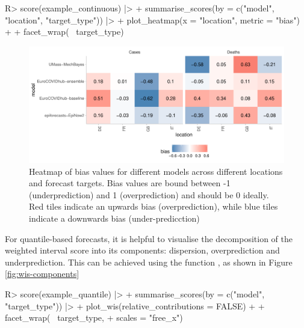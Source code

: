 \documentclass[
]{jss}
\begin{document}
\begin{CodeChunk}
\begin{CodeInput}
R> score(example_continuous) |>
+   summarise_scores(by = c("model", "location", "target_type")) |>
+   plot_heatmap(x = "location", metric = "bias") + 
+     facet_wrap(~ target_type) 
\end{CodeInput}
\begin{figure}[!h]

{\centering \includegraphics[width=1\linewidth]{manuscript_files/figure-latex/score-heatmap-1} 

}

\caption[Heatmap of bias values for different models across different locations and forecast targets]{Heatmap of bias values for different models across different locations and forecast targets. Bias values are bound between -1 (underprediction) and 1 (overprediction) and should be 0 ideally. Red tiles indicate an upwards bias (overprediction), while blue tiles indicate a downwards bias (under-predicction)}\label{fig:score-heatmap}
\end{figure}
\end{CodeChunk}

For quantile-based forecasts, it is helpful to visualise the
decomposition of the weighted interval score into its components:
dispersion, overprediction and underprediction. This can be achieved
using the function , as shown in Figure
\ref{fig:wis-components}

\begin{CodeChunk}
\begin{CodeInput}
R> score(example_quantile) |>
+   summarise_scores(by = c("model", "target_type")) |>
+   plot_wis(relative_contributions = FALSE) + 
+   facet_wrap(~ target_type, 
+              scales = "free_x") 
\end{CodeInput}
\end{CodeChunk}
\end{document}
